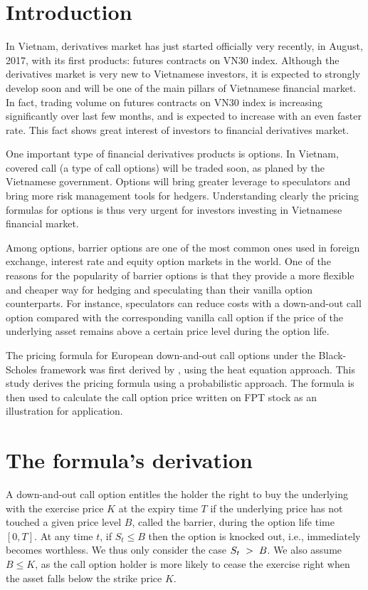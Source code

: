 \documentclass[12pt]{article}
\begin{document}
\section{Introduction}
In Vietnam, derivatives market has just started officially very recently, in August, 2017, with its first products: futures contracts on VN30 index. Although the derivatives market is very new to Vietnamese investors, it is expected to strongly develop soon and will be one of the main pillars of Vietnamese financial market. In fact, trading volume on futures contracts on VN30 index is increasing significantly over last few months, and is expected to increase with an even faster rate. 
This fact shows great interest of investors to financial derivatives market.

One important type of financial derivatives products is options. In Vietnam, covered call (a type of call options) will be traded soon, as planed by the Vietnamese government. Options will bring greater leverage to speculators and bring more risk management tools for hedgers. Understanding clearly the pricing formulas for options is thus very urgent for investors investing in Vietnamese financial market. 


Among options, barrier options are one of the most common ones used in foreign exchange, interest rate and equity option markets in the world. One of the reasons for the popularity of barrier options is that they provide a more flexible and cheaper way for hedging and speculating than their vanilla option counterparts. For instance,  speculators can reduce costs with a down-and-out call option compared with the corresponding vanilla call option if the price of the underlying asset remains above a certain price level during the option life. 

The pricing formula for European down-and-out call options under the Black-Scholes framework was first derived by \citet{Merton73}, using the heat equation approach.
This study derives the pricing formula using a probabilistic approach. The formula is then used to calculate the call option price written on FPT stock as an illustration for application. 

\section{The formula's derivation }
A down-and-out call option entitles the holder the right to buy the underlying with the exercise price $K$ at the expiry time $T$ if the underlying price has not touched a given price level $B$, called the barrier, during the option life time $[0, T]$. At any time $t$, if $S_t\le B$ then the option is knocked out, i.e.,  immediately becomes worthless.
We thus only consider the case $S_t\hspace{0.1cm} > \hspace{0.1cm} B$. We also assume $B \leq K$, as the call option holder is more likely to cease the exercise right when the asset falls below the strike price $K$. 
\end{document}

